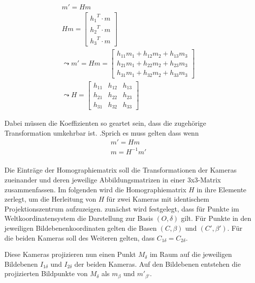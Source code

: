 \begin{gather}
	m' = Hm\\
	Hm = \begin{bmatrix}
	{h_1}^T \cdot m\\{h_2}^T \cdot m\\{h_3}^T \cdot m
	\end{bmatrix} \\
	\leadsto 
	m'= Hm= \begin{bmatrix}
	h_{11}m_1+h_{12}m_2+h_{13}m_3\\
	h_{21}m_1+h_{22}m_2+h_{23}m_3\\
	h_{31}m_1+h_{32}m_2+h_{33}m_3
	\end{bmatrix}\\
	\leadsto 
	H=\begin{bmatrix}
	h_{11}&h_{12}&h_{13}\\
	h_{21}&h_{22}&h_{23}\\
	h_{31}&h_{32}&h_{33}
	\end{bmatrix}
\end{gather}

Dabei müssen die Koeffizienten so geartet sein, dass die zugehörige Transformation umkehrbar ist. \cite{HZ}\cite{Peiffer}.Sprich es muss gelten dass wenn 
\begin{gather}
	m'=Hm\\
	m= H^{-1}m'
\end{gather}\\

Die Einträge der Homographiematrix  soll die Transformationen der Kameras zueinander und deren jeweilige Abbildungsmatrizen in einer 3x3-Matrix zusammenfassen. Im folgenden wird die Homographiematrix $H$ in ihre Elemente zerlegt, um die Herleitung von $H$ für zwei Kameras mit identischem Projektionszentrum aufzuzeigen\cite{HZ,Peiffer,Elements}. zunächst wird festgelegt, dass für Punkte im Weltkoordinatensystem die Darstellung zur Basis $(O,\delta)$ gilt. Für Punkte in den jeweiligen Bildebenenkoordinaten gelten die Basen $(C,\beta)$ und $(C',\beta')$. Für die beiden Kameras soll des Weiteren gelten, dass $C_{1\delta} = C_{2\delta}$. 

Diese Kameras projizieren nun einen Punkt $M_\delta$ im Raum auf die jeweiligen Bildebenen $I_{1\delta}$ und $I_{2\delta}$ der beiden Kameras. Auf den Bildebenen entstehen die projizierten Bildpunkte von $M_\delta$ als $m_\beta$ und $m'_{\beta'}$.

